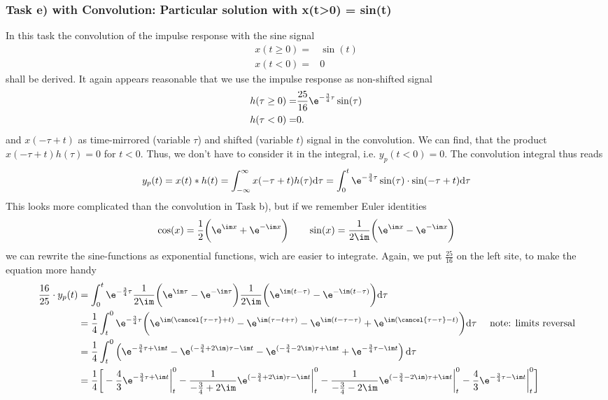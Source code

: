 \subsubsection{Task e) with Convolution: Particular solution with x(t>0) = sin(t)}
%
In this task the convolution of the impulse response with the sine signal
\begin{align}
x(t \geq 0) =& \sin(t)\\
x(t<0) =& 0
\end{align}
shall be derived.
%
It again appears reasonable that we use the impulse response as non-shifted signal
\begin{align}
h(\tau\geq 0) =& \frac{25}{16} \e^{-\frac{3}{4} \tau} \sin(\tau)\\
h(\tau < 0) =& 0.
\end{align}
and $x(-\tau + t)$ as time-mirrored (variable $\tau$) and shifted (variable $t$)
signal in the convolution.
%
We can find, that the product $x(-\tau + t) h(\tau)= 0$ for $t<0$.
Thus, we don't have to consider it in the integral, i.e. $y_p(t<0)=0$.
%
The convolution integral thus reads
\begin{align}
	y_p(t) =x(t) \ast h(t) = \int_{-\infty}^{\infty}x(-\tau+t) h(\tau)\mathrm{d}\tau=
	\int_0^t \e^{-\frac{3}{4}\tau}\sin(\tau)\cdot\sin(-\tau+t)\mathrm{d}\tau \nonumber
\end{align}
This looks more complicated than the convolution in Task b), but if we remember Euler identities
\begin{align}
	\cos(x)=\frac{1}{2}\bigg (\e^{\im x}+\e^{-\im x} \bigg ) \qquad
	\sin(x)=\frac{1}{2\im}\bigg (\e^{\im x}-\e^{-\im x}\bigg )
\end{align}
we can rewrite the sine-functions as exponential functions,
wich are easier to integrate.
%
Again, we put $\frac{25}{16}$ on the left site, to make the equation more handy
\begin{align}
	\label{eq:sinConvolutionA}
	\frac{16}{25}\cdot y_p(t)&=\int_0^t \e^{-\frac{3}{4}\tau}\frac{1}{2\im}\bigg(\e^{\im\tau}-\e^{-\im\tau}\bigg)\frac{1}{2\im}\bigg(\e^{\im(t-\tau)}-\e^{-\im(t-\tau)}\bigg)\mathrm{d}\tau \nonumber \\
	&=\frac{1}{4}\int_t^0 \e^{-\frac{3}{4}\tau}\bigg(\e^{\im(\cancel {\tau-\tau}+t)}-\e^{\im(\tau-t+\tau)}-\e^{\im(t-\tau-\tau)}+\e^{\im(\cancel {\tau-\tau}-t)}\bigg)\mathrm{d}\tau \quad\text{ note: limits reversal} \nonumber \\
	&=\frac{1}{4}\int_t^0 \left(\e^{-\frac{3}{4}\tau +\im t}-\e^{(-\frac{3}{4}+2\im)\tau-\im t}-\e^{(-\frac{3}{4}-2\im)\tau+\im t}+\e^{-\frac{3}{4}\tau-\im t}\right)\mathrm{d}\tau \nonumber \\
	&=\frac{1}{4}\bigg[-\frac{4}{3}\e^{-\frac{3}{4}\tau+\im t}\bigg|_t^0 -\frac{1}{-\frac{3}{4}+2\im}\e^{(-\frac{3}{4}+2\im)\tau-\im t}\bigg |_t^0-\frac{1}{-\frac{3}{4}-2\im}\e^{(-\frac{3}{4}-2\im)\tau+\im t}\bigg |_t^0-\frac{4}{3}\e^{-\frac{3}{4}\tau-\im t}\bigg |_t^0\bigg ]
\end{align}
